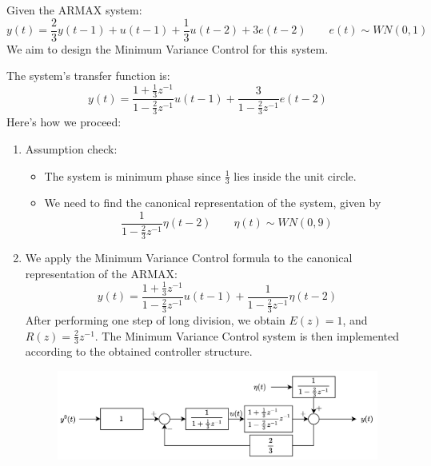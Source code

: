\begin{example}
    Given the ARMAX system:
    \[y(t)=\dfrac{2}{3}y(t-1)+u(t-1)+\dfrac{1}{3}u(t-2)+3e(t-2)\qquad e(t)\sim WN(0,1)\]
    We aim to design the Minimum Variance Control for this system.
    
    The system's transfer function is:
    \[y(t)=\dfrac{1+\frac{1}{3}z^{-1}}{1-\frac{2}{3}z^{-1}}u(t-1)+\dfrac{3}{1-\frac{2}{3}z^{-1}}e(t-2)\]
    Here's how we proceed:
    \begin{enumerate}
        \item Assumption check:
            \begin{itemize}
                \item The system is minimum phase since $\frac{1}{3}$ lies inside the unit circle.
                \item We need to find the canonical representation of the system, given by 
                    \[\dfrac{1}{1-\frac{2}{3}z^{-1}}\eta(t-2) \qquad \eta(t)\sim WN(0,9)\]
            \end{itemize}
        \item We apply the Minimum Variance Control formula to the canonical representation of the ARMAX:
            \[y(t)=\dfrac{1+\frac{1}{3}z^{-1}}{1-\frac{2}{3}z^{-1}}u(t-1)+\dfrac{1}{1-\frac{2}{3}z^{-1}}\eta(t-2)\]
            After performing one step of long division, we obtain $E(z)=1$, and $R(z)=\frac{2}{3}z^{-1}$. 
            The Minimum Variance Control system is then implemented according to the obtained controller structure.
            \begin{figure}[H]
                \centering
                \includegraphics[width=0.75\linewidth]{images/mvc.png}
            \end{figure}
    \end{enumerate}
\end{example}